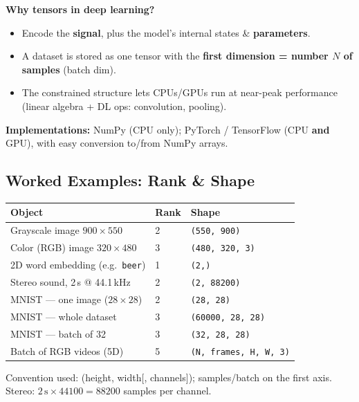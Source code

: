 \documentclass[10pt,a4paper]{article}
\begin{document}
	\begin{importantbox}
		\textbf{Why tensors in deep learning?}
		\begin{itemize}[leftmargin=*]
			\item Encode the \textbf{signal}, plus the model's internal states \& \textbf{parameters}.
			\item A dataset is stored as one tensor with the \textbf{first dimension = number $N$ of samples} (batch dim).
			\item The constrained structure lets CPUs/GPUs run at near-peak performance (linear algebra + DL ops: convolution, pooling).
		\end{itemize}
		\textbf{Implementations:} NumPy (CPU only); PyTorch / TensorFlow (CPU \textbf{and} GPU), with easy conversion to/from NumPy arrays.
	\end{importantbox}

	\subsection{Worked Examples: Rank \& Shape}

	\begin{center}
		\begin{tabular}{lll}
			\toprule
			Object & Rank & Shape \\
			\midrule
			Grayscale image $900\times550$        & 2 & \texttt{(550, 900)} \\
			Color (RGB) image $320\times480$      & 3 & \texttt{(480, 320, 3)} \\
			2D word embedding (e.g.\ \texttt{beer}) & 1 & \texttt{(2,)} \\
			Stereo sound, 2\,s @ 44.1\,kHz        & 2 & \texttt{(2, 88200)} \\
			MNIST --- one image ($28\times28$)     & 2 & \texttt{(28, 28)} \\
			MNIST --- whole dataset                & 3 & \texttt{(60000, 28, 28)} \\
			MNIST --- batch of 32                  & 3 & \texttt{(32, 28, 28)} \\
			Batch of RGB videos (5D)              & 5 & \texttt{(N, frames, H, W, 3)} \\
			\bottomrule
		\end{tabular}
	\end{center}
	\noindent\footnotesize Convention used: (height, width[, channels]); samples/batch on the first axis. Stereo: $2\,\text{s}\times44100 = 88200$ samples per channel. \normalsize
\end{document}
